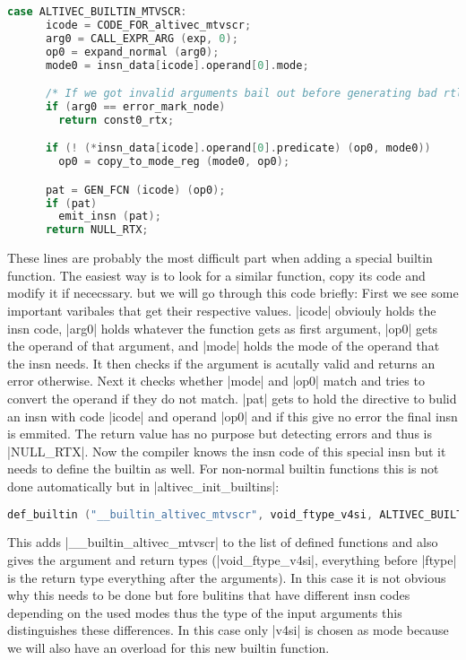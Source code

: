 \begin{lstlisting}[language=C++,basicstyle=\ttfamily\scriptsize,keywordstyle=\color{red}]
case ALTIVEC_BUILTIN_MTVSCR:
      icode = CODE_FOR_altivec_mtvscr;
      arg0 = CALL_EXPR_ARG (exp, 0);
      op0 = expand_normal (arg0);
      mode0 = insn_data[icode].operand[0].mode;

      /* If we got invalid arguments bail out before generating bad rtl.  */
      if (arg0 == error_mark_node)
    	return const0_rtx;

      if (! (*insn_data[icode].operand[0].predicate) (op0, mode0))
     	op0 = copy_to_mode_reg (mode0, op0);

      pat = GEN_FCN (icode) (op0);
      if (pat)
    	emit_insn (pat);
      return NULL_RTX;
\end{lstlisting}
These lines are probably the most difficult part when adding a special builtin function. The easiest way is to look for a similar function, copy its code and modify it if nececssary. but we will go through this code briefly:
First we see some important varibales that get their respective values. |icode| obviouly holds the insn code, |arg0| holds whatever the function gets as first argument, |op0| gets the operand of that argument, and |mode| holds the mode of the operand that the insn needs. It then checks if the argument is acutally valid and returns an error otherwise. Next it checks whether |mode| and |op0| match and tries to convert the operand if they do not match. |pat| gets to hold the directive to bulid an insn with code |icode| and operand |op0| and if this give no error the final insn is emmited. The return value has no purpose but detecting errors and thus is |NULL_RTX|.
Now the compiler knows the insn code of this special insn but it needs to define the builtin as well. For non-normal builtin functions this is not done automatically but in |altivec_init_builtins|:
\begin{lstlisting}[language=C++,basicstyle=\ttfamily\scriptsize,keywordstyle=\color{red}] 
def_builtin ("__builtin_altivec_mtvscr", void_ftype_v4si, ALTIVEC_BUILTIN_MTVSCR);
\end{lstlisting}
This adds |__builtin_altivec_mtvscr| to the list of defined functions and also gives the argument and return types (|void_ftype_v4si|, everything before |ftype| is the return type everything after the arguments). In this case it is not obvious why this needs to be done but fore bulitins that have different insn codes depending on the used modes thus the type of the input arguments this distinguishes these differences. In this case only |v4si| is chosen as mode because we will also have an overload for this new builtin function.
